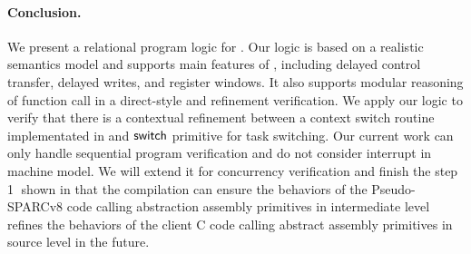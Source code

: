 \paragraph{\textbf{Conclusion.}}
We present a relational program logic for \sparc.
Our logic is based on a realistic semantics
model and supports main features of \sparc,
including delayed control transfer, delayed writes,
and register windows.
It also supports modular reasoning of 
function call in a direct-style and 
refinement verification. 
We apply our logic to verify  
that there is a contextual refinement between 
a context switch routine implementated 
in \sparc{} and $\mathsf{switch}$ primitive for task switching.
Our current work can only handle
sequential \sparc{} program verification and 
do not consider interrupt in machine model.  
We will extend it for concurrency verification 
and finish the step {\color{blue} \textcircled{1}} shown in
\Fig{\ref{fig:idea to establish contextual refinement}}
that the compilation can ensure the behaviors 
of the Pseudo-SPARCv8 code calling abstraction assembly 
primitives in intermediate level refines 
the behaviors of 
the client C code calling abstract assembly primitives 
in source level in the future. 
